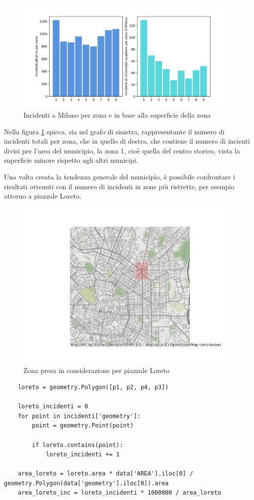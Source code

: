\documentclass[a4paper,12pt]{report}
\begin{document}
\begin{figure}
    \includegraphics[width=\linewidth]{../src/municipi_milano/incidenti_superf.png}
    \caption{Incidenti a Milano per zona e in base alla superficie della zona}
    \label{fig:incidenti-chilometro}
\end{figure}

Nella figura \ref{fig:incidenti-chilometro} spicca, sia nel grafo di sinistra, rappresentante 
il numero di incidenti totali per zona, che in 
quello di destra, che contiene il numero di incienti divisi per l'area del municipio, 
la zona 1, cioè quella del centro storico, vista la superficie minore 
rispetto agli altri municipi.

Una volta creata la tendenza generale del municipio, è possibile confrontare i risultati 
ottenuti con il numero di incidenti in zone più ristrette, per esempio attorno a piazzale Loreto.

\begin{figure}
    \hfill\includegraphics[width=0.6\linewidth]{../src/municipi_milano/zona_loreto.png}\hspace*{\fill}
    \caption{Zona presa in considerazione per piazzale Loreto}
    \label{fig:zona-loreto}
\end{figure}

\begin{lstlisting}
    loreto = geometry.Polygon([p1, p2, p4, p3])

    loreto_incidenti = 0
    for point in incidenti['geometry']: 
        point = geometry.Point(point)

        if loreto.contains(point): 
            loreto_incidenti += 1

    area_loreto = loreto.area * data['AREA'].iloc[0] / geometry.Polygon(data['geometry'].iloc[0]).area
    area_loreto_inc = loreto_incidenti * 1000000 / area_loreto
\end{lstlisting}
\end{document}
